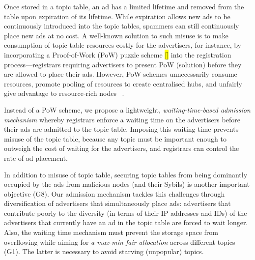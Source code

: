 Once stored in a topic table, an ad has a limited lifetime and removed from the table upon expiration of its lifetime. While expiration allows new ads to be continuously introduced into the topic tables, spammers can still continuously place new ads at no cost. A well-known solution to such misuse is to make consumption of topic table resources costly for the advertisers, for instance, by incorporating a Proof-of-Work (PoW) puzzle scheme \hl{[]} into the registration process---\eg registrars requiring advertisers to present PoW (\ie solution) before they are allowed to place their ads. However, PoW schemes unnecessarily consume resources, promote pooling of resources to create centralised hubs, and unfairly give advantage to resource-rich nodes ~\cite{gervais2014bitcoin}. 



Instead of a PoW scheme, we propose a lightweight, \textit{waiting-time-based admission mechanism} whereby registrars enforce a waiting time on the advertisers before their ads are admitted to the topic table. Imposing this waiting time prevents misuse of the topic table, because any topic must be important enough to outweigh the cost of waiting for the advertisers, and registrars can control the rate of ad placement. 

In addition to misuse of topic table, securing topic tables from being dominantly occupied by the ads from malicious nodes (and their Sybils) is another important objective (G8). Our admission mechanism tackles this challenges through diversification of advertisers that simultaneously place ads: advertisers that contribute poorly to the diversity (in terms of their IP addresses and IDs) of the advertisers that currently have an ad in the topic table are forced to wait longer. Also, the waiting time mechanism must prevent the storage space from overflowing while aiming for \textit{a max-min fair allocation} across different topics (G1). The latter is necessary to avoid starving (unpopular) topics. %

